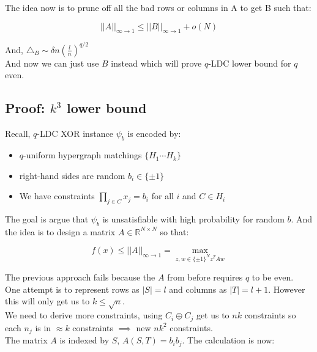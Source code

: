 \documentclass{article}
\begin{document}
\noindent The idea now is to prune off all the bad rows or columns in A to get B such that:

\begin{equation*}
||A||_{\infty \to 1} \leq ||B||_{\infty \to 1} +o(N)
\end{equation*}

\noindent And, $\triangle_B \sim \delta n (\frac{l}{n})^{q/2}$\\

\noindent And now we can just use $B$ instead which will prove $q$-LDC lower bound for $q$ even.

\subsection{Proof: $k^3$ lower bound}

Recall, $q$-LDC XOR instance $\psi_b$ is encoded by:

\begin{itemize}
    \item $q$-uniform hypergraph matchings $\{ H_1 \cdots H_k \}$
    \item right-hand sides are random $b_i \in \{ \pm 1 \}$
    \item We have constraints $\displaystyle\prod_{j \in C} x_j=b_i$ for all $i$ and $C \in H_i$
\end{itemize}

\noindent The goal is argue that $\psi_b$ is unsatisfiable with high probability for random $b$. And the idea is to design a matrix $A \in \mathbb{R}^{N \times N}$ so that:

\begin{equation*}
f(x) \leq ||A||_{\infty \to 1} = \max_{z, w \in \{ \pm 1 \}^N z^TAw}
\end{equation*}

\noindent The previous approach fails because the $A$ from before requires $q$ to be even.\\

\noindent One attempt is to represent rows as $|S|=l$ and columns as $|T|=l+1$. However this will only get us to $k \leq \sqrt{n}$.\\

\noindent We need to derive more constraints, using $C_i \oplus C_j$ get us to $nk$ constraints so each $n_j$ is in $\approx k$ constraints $\implies$ new $nk^2$ constraints. \\

\noindent The matrix $A$ is indexed by $S$, $A(S,T)=b_ib_j$. The calculation is now:
\end{document}
